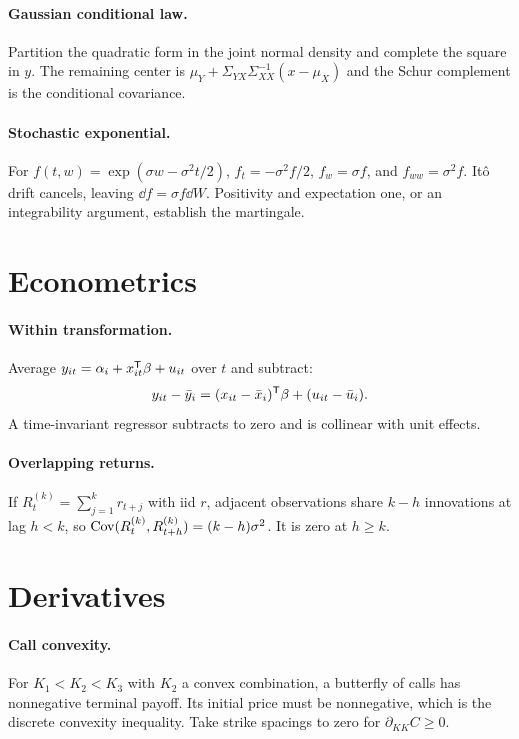 \paragraph{Gaussian conditional law.}
Partition the quadratic form in the joint normal density and complete the square in
$y$. The remaining center is
$\mu_Y+\Sigma_{YX}\Sigma_{XX}^{-1}(x-\mu_X)$ and the Schur complement is the
conditional covariance.

\paragraph{Stochastic exponential.}
For $f(t,w)=\exp(\sigma w-\sigma^2t/2)$,
$f_t=-\sigma^2f/2$, $f_w=\sigma f$, and $f_{ww}=\sigma^2f$. Itô drift cancels,
leaving $\dd f=\sigma f\dd W$. Positivity and expectation one, or an integrability
argument, establish the martingale.

\section{Econometrics}

\paragraph{Within transformation.}
Average $y_{it}=\alpha_i+x_{it}^\mathsf T\beta+u_{it}$ over $t$ and subtract:
\[
y_{it}-\bar y_i=(x_{it}-\bar x_i)^\mathsf T\beta+(u_{it}-\bar u_i).
\]
A time-invariant regressor subtracts to zero and is collinear with unit effects.

\paragraph{Overlapping returns.}
If $R_t^{(k)}=\sum_{j=1}^k r_{t+j}$ with iid $r$, adjacent observations share
$k-h$ innovations at lag $h<k$, so
$\operatorname{Cov}(R_t^{(k)},R_{t+h}^{(k)})=(k-h)\sigma^2$. It is zero at $h\geq k$.

\section{Derivatives}

\paragraph{Call convexity.}
For $K_1<K_2<K_3$ with $K_2$ a convex combination, a butterfly of calls has
nonnegative terminal payoff. Its initial price must be nonnegative, which is the
discrete convexity inequality. Take strike spacings to zero for
$\partial_{KK}C\geq0$.

